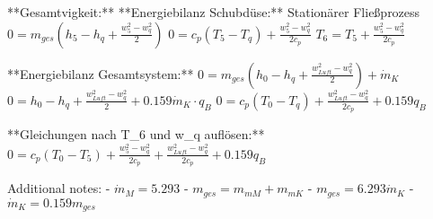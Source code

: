 **Gesamtvigkeit:**  
**Energiebilanz Schubdüse:** Stationärer Fließprozess  
\( 0 = m_{ges} \left( h_5 - h_q + \frac{w_5^2 - w_q^2}{2} \right) \)  
\( 0 = c_p \left( T_5 - T_q \right) + \frac{w_5^2 - w_q^2}{2 c_p} \)  
\( T_6 = T_5 + \frac{w_5^2 - w_q^2}{2 c_p} \)  

**Energiebilanz Gesamtsystem:**  
\( 0 = m_{ges} \left( h_0 - h_q + \frac{w_{Luft}^2 - w_q^2}{2} \right) + \dot{m}_K \)  
\( 0 = h_0 - h_q + \frac{w_{Luft}^2 - w_q^2}{2} + 0.159 \dot{m}_K \cdot q_B \)  
\( 0 = c_p \left( T_0 - T_q \right) + \frac{w_{Luft}^2 - w_q^2}{2 c_p} + 0.159 q_B \)  

**Gleichungen nach T_6 und w_q auflösen:**  
\( 0 = c_p \left( T_0 - T_5 \right) + \frac{w_5^2 - w_q^2}{2 c_p} + \frac{w_{Luft}^2 - w_q^2}{2 c_p} + 0.159 q_B \)  

Additional notes:  
- \( \dot{m}_M = 5.293 \)  
- \( m_{ges} = m_{mM} + m_{mK} \)  
- \( m_{ges} = 6.293 \dot{m}_K \)  
- \( \dot{m}_K = 0.159 m_{ges} \)